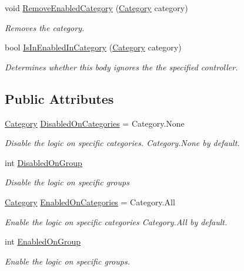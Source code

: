 \begin{DoxyCompactItemize}
void \hyperlink{class_farseer_physics_1_1_common_1_1_physics_logic_1_1_filter_data_a7df22d524a65f85b5fac1c6216713c30}{Remove\+Enabled\+Category} (\hyperlink{namespace_farseer_physics_1_1_dynamics_a411fb391cb862402e877a2d3d4e11bef}{Category} category)
\begin{DoxyCompactList}\small\item\em Removes the category. \end{DoxyCompactList}\item 
bool \hyperlink{class_farseer_physics_1_1_common_1_1_physics_logic_1_1_filter_data_aef0dbd52f247ade25e8a1d2f323f6464}{Is\+In\+Enabled\+In\+Category} (\hyperlink{namespace_farseer_physics_1_1_dynamics_a411fb391cb862402e877a2d3d4e11bef}{Category} category)
\begin{DoxyCompactList}\small\item\em Determines whether this body ignores the the specified controller. \end{DoxyCompactList}\end{DoxyCompactItemize}
\subsection*{Public Attributes}
\begin{DoxyCompactItemize}
\item 
\hyperlink{namespace_farseer_physics_1_1_dynamics_a411fb391cb862402e877a2d3d4e11bef}{Category} \hyperlink{class_farseer_physics_1_1_common_1_1_physics_logic_1_1_filter_data_accff4c3d01561843d2e6daaf3db73c95}{Disabled\+On\+Categories} = Category.\+None
\begin{DoxyCompactList}\small\item\em Disable the logic on specific categories. Category.\+None by default. \end{DoxyCompactList}\item 
int \hyperlink{class_farseer_physics_1_1_common_1_1_physics_logic_1_1_filter_data_ae3edc879b314a66d8ff67e5d2d0a8fec}{Disabled\+On\+Group}
\begin{DoxyCompactList}\small\item\em Disable the logic on specific groups \end{DoxyCompactList}\item 
\hyperlink{namespace_farseer_physics_1_1_dynamics_a411fb391cb862402e877a2d3d4e11bef}{Category} \hyperlink{class_farseer_physics_1_1_common_1_1_physics_logic_1_1_filter_data_a087e65e175df45d7642ab40569f74e3f}{Enabled\+On\+Categories} = Category.\+All
\begin{DoxyCompactList}\small\item\em Enable the logic on specific categories Category.\+All by default. \end{DoxyCompactList}\item 
int \hyperlink{class_farseer_physics_1_1_common_1_1_physics_logic_1_1_filter_data_a36a8f83ec200dbac9fc42c59cabe1726}{Enabled\+On\+Group}
\begin{DoxyCompactList}\small\item\em Enable the logic on specific groups. \end{DoxyCompactList}\end{DoxyCompactItemize}


